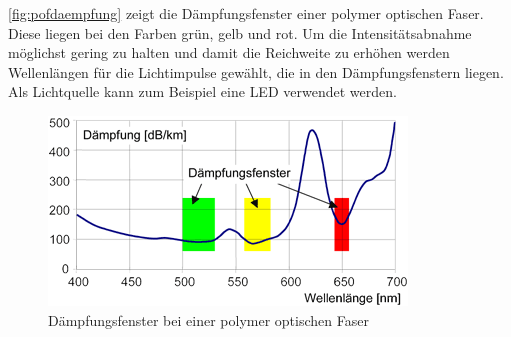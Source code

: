 \autoref{fig:pofdaempfung} zeigt die Dämpfungsfenster einer polymer optischen
Faser. Diese liegen bei den Farben grün, gelb und rot. Um die Intensitätsabnahme
möglichst gering zu halten und damit die Reichweite zu erhöhen werden
Wellenlängen für die Lichtimpulse gewählt, die in den Dämpfungsfenstern
liegen. Als Lichtquelle kann zum Beispiel eine LED verwendet
werden. \cite{pofacsi} %

\begin{figure}[h]
    \begin{center}
        \begin{minipage}[t]{0.4\textwidth}
            \begin{center}
                \includegraphics[height=0.1\textheight]{Bilder/Optische_Wellenleiter_Die_Polymer_Optische_Faser/Funktionsweise/pofdaempfung.png}
                \caption[Dämpfungsfenster bei einer polymer optischen Faser \newline \url{http://www.pofac.fh-nuernberg.de/pofac/de/was_sind_pof/images/pmma_daempfung.png}]{Dämpfungsfenster bei einer polymer optischen Faser}
                \label{fig:pofdaempfung}
            \end{center}
        \end{minipage}
    \end{center}
\end{figure}
